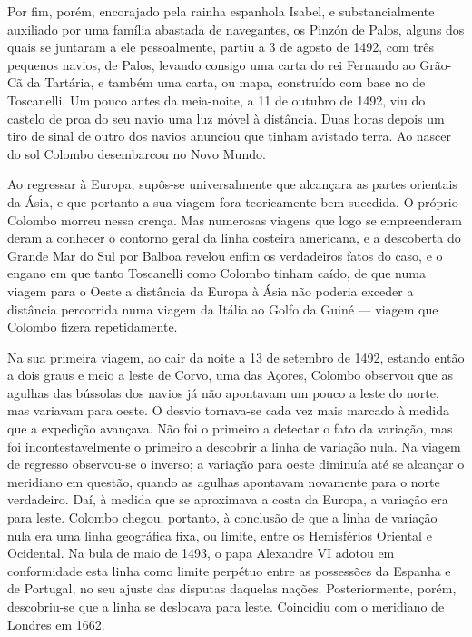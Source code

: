 \documentclass[11pt,a5paper,twoside,openany]{book}
\begin{document}
Por fim, porém, encorajado pela rainha espanhola Isabel, e substancialmente auxiliado por uma família abastada de navegantes, os Pinzón de Palos, alguns dos quais se juntaram a ele pessoalmente, partiu a 3 de agosto de 1492, com três pequenos navios, de Palos, levando consigo uma carta do rei Fernando ao Grão-Cã da Tartária, e também uma carta, ou mapa, construído com base no de Toscanelli. Um pouco antes da meia-noite, a 11 de outubro de 1492, viu do castelo de proa do seu navio uma luz móvel à distância. Duas horas depois um tiro de sinal de outro dos navios anunciou que tinham avistado terra. Ao nascer do sol Colombo desembarcou no Novo Mundo.

Ao regressar à Europa, supôs-se universalmente que alcançara as partes orientais da Ásia, e que portanto a sua viagem fora teoricamente bem-sucedida. O próprio Colombo morreu nessa crença. Mas numerosas viagens que logo se empreenderam deram a conhecer o contorno geral da linha costeira americana, e a descoberta do Grande Mar do Sul por Balboa revelou enfim os verdadeiros fatos do caso, e o engano em que tanto Toscanelli como Colombo tinham caído, de que numa viagem para o Oeste a distância da Europa à Ásia não poderia exceder a distância percorrida numa viagem da Itália ao Golfo da Guiné — viagem que Colombo fizera repetidamente.

Na sua primeira viagem, ao cair da noite a 13 de setembro de 1492, estando então a dois graus e meio a leste de Corvo, uma das Açores, Colombo observou que as agulhas das bússolas dos navios já não apontavam um pouco a leste do norte, mas variavam para oeste. O desvio tornava-se cada vez mais marcado à medida que a expedição avançava. Não foi o primeiro a detectar o fato da variação, mas foi incontestavelmente o primeiro a descobrir a linha de variação nula. Na viagem de regresso observou-se o inverso; a variação para oeste diminuía até se alcançar o meridiano em questão, quando as agulhas apontavam novamente para o norte verdadeiro. Daí, à medida que se aproximava a costa da Europa, a variação era para leste. Colombo chegou, portanto, à conclusão de que a linha de variação nula era uma linha geográfica fixa, ou limite, entre os Hemisférios Oriental e Ocidental. Na bula de maio de 1493, o papa Alexandre VI adotou em conformidade esta linha como limite perpétuo entre as possessões da Espanha e de Portugal, no seu ajuste das disputas daquelas nações. Posteriormente, porém, descobriu-se que a linha se deslocava para leste. Coincidiu com o meridiano de Londres em 1662.
\end{document}
